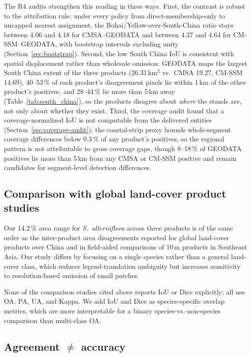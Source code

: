 \documentclass[11pt]{article}
\begin{document}
The R4 audits strengthen this reading in three ways. First, the contrast is
robust to the attribution rule: under every policy from direct-membership-only
to uncapped nearest assignment, the Bohai/Yellow-over-South-China ratio stays
between 4.06 and 4.18 for CMSA--GEODATA and between 4.37 and 4.64 for
CM-SSM--GEODATA, with bootstrap intervals excluding unity
(Section~\ref{sec:bootstrap}). Second, the low South China IoU is
consistent with spatial displacement rather than wholesale omission:
GEODATA maps the largest South China extent of
the three products (26.31\,km$^2$ vs.\ CMSA 19.27, CM-SSM 14.69), 40--53\,\%
of each product's disagreement pixels lie within 1\,km of the other
product's positives, and 28--44\,\% lie more than 5\,km away
(Table~\ref{tab:south_china}), so the products disagree about \emph{where}
the stands are, not only about whether they exist. Third, the coverage audit
found that a coverage-normalized IoU is not computable from the delivered
entities (Section~\ref{sec:coverage-audit}); the coastal-strip proxy bounds
whole-segment coverage differences below 0.3\,\% of any product's positives,
so the regional pattern is not attributable to gross coverage gaps, though
8--18\,\% of GEODATA positives lie more than 5\,km from any CMSA or CM-SSM
positive and remain candidates for segment-level detection differences.

\subsection{Comparison with global land-cover product studies}

Our 14.2\,\% area range for \textit{S.~alterniflora} across three products is of
the same order as the inter-product area disagreements reported for global
land-cover products over China\citep{wang_2024_ijde, zhao_2023_rs, xu_2024_rse}
and in field-aided comparisons of 10\,m products in Southeast
Asia\citep{ding_2022_rs}. Our study
differs by focusing on a single species rather than a general land-cover class,
which reduces legend-translation ambiguity but increases sensitivity to
resolution-based omission of small patches.

None of the comparison studies cited above reports IoU
or Dice explicitly; all use OA, PA, UA, and Kappa. We add IoU and Dice as
species-specific overlap metrics, which are more interpretable for a binary
species-vs.-non-species comparison than multi-class OA.

\subsection{Agreement $\neq$ accuracy}
\end{document}
